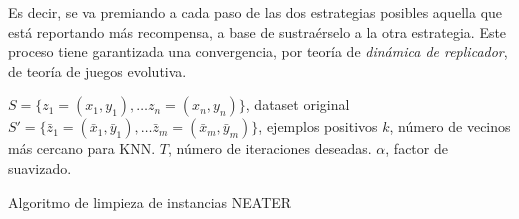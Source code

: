 Es decir, se va premiando a cada paso de las dos estrategias posibles aquella que está reportando más recompensa, a base de
sustraérselo a la otra estrategia. Este proceso tiene garantizada una convergencia, por teoría de \textit{dinámica de replicador},
de teoría de juegos evolutiva.


\begin{algorithm}[H]
\begin{algorithmic}[1]
  \REQUIRE $S = \{z_1 = (x_1, y_1), \ldots z_n = (x_n, y_n)\}$, dataset original
  \REQUIRE $S' = \{\bar{z}_1=(\bar{x}_1, \bar{y}_1), \ldots \bar{z}_m=(\bar{x}_m, \bar{y}_m)\}$, ejemplos positivos
  \REQUIRE $k$, número de vecinos más cercano para KNN.
  \REQUIRE $T$, número de iteraciones deseadas.
  \REQUIRE $\alpha$, factor de suavizado.
  \NEWLINE
    \ENDFOR
  \ENDFOR
  \NEWLINE
    \ENDIF
  \ENDFOR
  \NEWLINE
\end{algorithmic}
\caption{Algoritmo de limpieza de instancias NEATER}
\label{alg:neater}
\end{algorithm}
